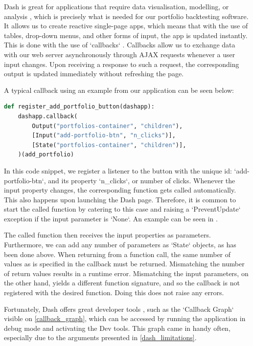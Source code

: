\documentclass[main.tex]{subfiles}
\begin{document}
Dash is great for applications that require data visualisation, modelling, or analysis \cite{dash}, which is precisely what is needed for our portfolio backtesting software. It allows us to create reactive single-page apps, which means that with the use of tables, drop-down menus, and other forms of input, the app is updated instantly. This is done with the use of `callbacks` \cite{callbacks}. Callbacks allow us to exchange data with our web server asynchronously through AJAX requests whenever a user input changes. Upon receiving a response to such a request, the corresponding output is updated immediately without refreshing the page.

A typical callback using an example from our application can be seen below:

\begin{lstlisting}[language=Python, caption=setup.py - Development environment, label=lst:callback_example]
def register_add_portfolio_button(dashapp):
    dashapp.callback(
        Output("portfolios-container", "children"),
        [Input("add-portfolio-btn", "n_clicks")],
        [State("portfolios-container", "children")],
    )(add_portfolio)
\end{lstlisting}

In this code snippet, we register a listener to the button with the unique id: `add-portfolio-btn`, and its property `n\_clicks`, or number of clicks. Whenever the input property changes, the corresponding function gets called automatically. This also happens upon launching the Dash page. Therefore, it is common to start the called function by catering to this case and raising a `PreventUpdate` exception if the input parameter is `None`. An example can be seen in \cite{prevent_update}.

The called function then receives the input properties as parameters. Furthermore, we can add any number of parameters as `State` objects, as has been done above. When returning from a function call, the same number of values as is specified in the callback must be returned. Mismatching the number of return values results in a runtime error. Mismatching the input parameters, on the other hand, yields a different function signature, and so the callback is not registered with the desired function. Doing this does not raise any errors. 

Fortunately, Dash offers great developer tools \cite{dash_dev_tools}, such as the `Callback Graph` visible on \figurename{\ref{callback_graph}}, which can be accessed by running the application in debug mode and activating the Dev tools. This graph came in handy often, especially due to the arguments presented in \ref{dash_limitations}.
\end{document}
